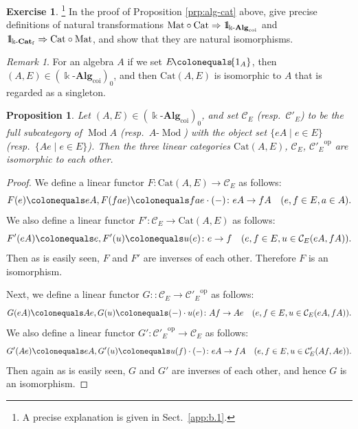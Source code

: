 \documentclass{surv-l}
\numberwithin{equation}{chapter}
\numberwithin{figure}{chapter}
\theoremstyle{plain}
\newtheorem{prp}[thm]{Proposition}
\theoremstyle{definition}
\newtheorem{exc}[thm]{Exercise}
\theoremstyle{remark}
\newtheorem{rmk}[thm]{Remark}
\newcommand{\id}{1\kern-.25em{\text{{\rm l}}}}
\newcommand{\kCat}{\Bbbk\text{-}\mathbf{Cat}}
\newcommand{\lMod}{\text{-}\!\Mod}
\DeclareMathOperator{\Mod}{Mod}
\DeclareMathOperator{\blank}{-}
\begin{document}
\begin{exc}\hspace{-1.2ex}\footnote{A precise explanation is given in Sect.\ \ref{app:b.1}.}
\label{exc:fin-cats}\label{ex:2.3.9}
In the proof of Proposition \ref{prp:alg-cat} above,
give precise definitions of natural transformations
$\mathrm{Mat} \circ \mathrm{Cat} \Rightarrow \id_{\Bbbk\text{-}\mathbf{Alg}_{\mathrm{coi}}}$ and
$\id_{\kCat_{\mathrm{f}}} \Rightarrow \mathrm{Cat} \circ \mathrm{Mat}$, and show that they are
natural isomorphisms.
\end{exc}

\begin{rmk}
For an algebra $A$ if we set $E\!\colonequals\!\{1_A\}$, then $(A, E) \!\in\! (\Bbbk\text{-}\mathbf{Alg}_{\mathrm{coi}})_0$,
and then $\mathrm{Cat}(A, E)$ is isomorphic to $A$ that is regarded as a singleton.
\end{rmk}

\begin{prp}\label{prp:Cat-A-caC-A}
Let $(A, E) \in (\Bbbk\text{-}\mathbf{Alg}_{\mathrm{coi}})_0$, and set
${\mathcal{C}}_E$ (resp.\ ${\mathcal{C}}'_E$) to be
the full subcategory of
$\Mod A$ (resp.\ $A\lMod$) with the object set
$\{eA \mid e \in E\}$ (resp.\ $\{Ae \mid e \in E\}$).
Then the three linear categories
$\mathrm{Cat}(A, E)$, ${\mathcal{C}}_E$, ${{\mathcal{C}}'_E}^{\mathrm{op}}$ are isomorphic to each other.
\end{prp}

\begin{proof}
We define a linear functor $F \colon \mathrm{Cat}(A, E) \to {\mathcal{C}}_E$ as follows:
\[
F(e)\colonequals  eA, F(fae)\colonequals  fae\cdot(\blank) \colon eA \to fA \quad (e, f \in E, a\in A).
\]
We also define a linear functor $F' \colon {\mathcal{C}}_E \to \mathrm{Cat}(A, E)$ as follows:
\[
F'(eA)\colonequals  e, F'(u)\colonequals  u(e) \colon e \to f \quad (e,f  \in E, u \in {\mathcal{C}}_E(eA, fA)).
\]
Then as is easily seen, $F$ and $F'$ are inverses of each other.
Therefore $F$ is an isomorphism.

Next, we define a linear functor $G \colon \colon {\mathcal{C}}_E \to {{\mathcal{C}}'_E}^{\mathrm{op}}$
as follows:
\[
 G(eA)\colonequals  Ae, G(u)\colonequals  (\blank)\cdot u(e) \colon Af \to Ae
 \quad (e, f \in E, u \in {\mathcal{C}}_E(eA,fA)).
\]
We also define a linear functor
$G' \colon {{\mathcal{C}}'_E}^{\mathrm{op}} \to {\mathcal{C}}_E$ as follows:
\[
G'(Ae)\colonequals  eA, G'(u)\colonequals  u(f)\cdot(\blank) \colon eA \to fA
\quad (e, f \in E, u \in {\mathcal{C}}'_E(Af, Ae)).
\]
Then again as is easily seen, $G$ and $G'$ are inverses of each other,
and hence $G$ is an isomorphism.
\end{proof}
\end{document}
